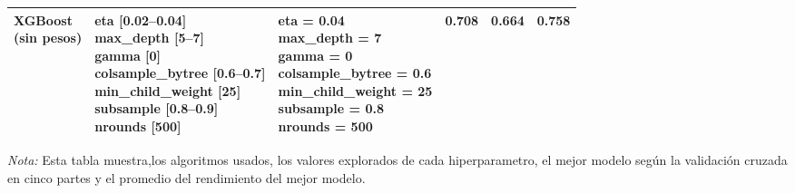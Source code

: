 \begin{table}[!h]
\begin{tabular}{p{2.8cm} p{5cm} p{4cm} ccc}
\shortstack[l]{XGBoost\\(sin pesos)} &
\shortstack[l]{eta [0.02–0.04]\\max\_depth [5–7]\\gamma [0]\\colsample\_bytree [0.6–0.7]\\min\_child\_weight [25]\\subsample [0.8–0.9]\\nrounds [500]} &
\shortstack[l]{eta = 0.04\\max\_depth = 7\\gamma = 0\\colsample\_bytree = 0.6\\min\_child\_weight = 25\\subsample = 0.8\\nrounds = 500} &
0.708 & 0.664 & 0.758 \\
\bottomrule
\end{tabular}
\end{table}
\medskip
\begin{minipage}{\textwidth}

\tiny
\textit{Nota:}  Esta tabla muestra,los algoritmos usados, los valores explorados de cada hiperparametro, el mejor modelo según la validación cruzada en cinco partes y el promedio del rendimiento del mejor modelo. 

\end{minipage}


